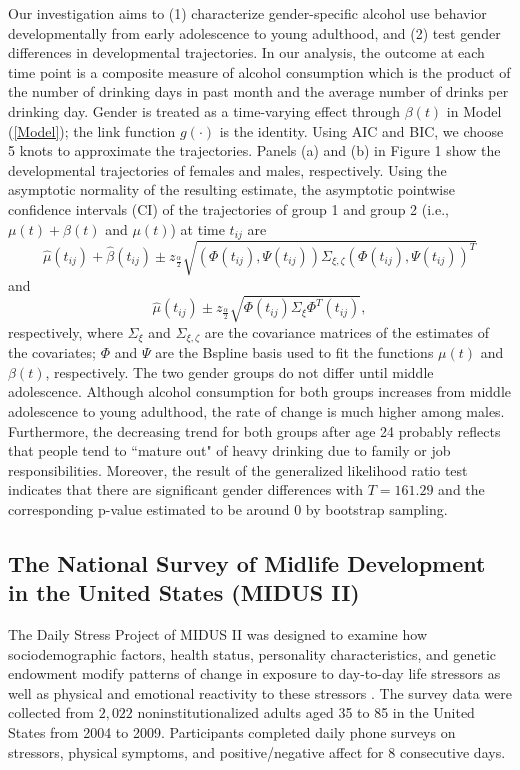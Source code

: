 Our investigation aims to (1) characterize gender-specific alcohol
use behavior developmentally from early adolescence to young
adulthood, and (2) test gender differences in developmental
trajectories. In our analysis, the outcome at each time point is a
composite measure of alcohol consumption which is the product of
the number of drinking days in past month and the average number
of drinks per drinking day. Gender is treated as a time-varying
effect through $\beta(t)$ in Model (\ref{Model}); the link
function $g(\cdot)$ is the identity. Using AIC and BIC, we choose
5 knots to approximate the trajectories. Panels (a) and (b) in
Figure 1 show the developmental trajectories of females and males,
respectively. Using the asymptotic normality of the resulting
estimate, the asymptotic pointwise confidence intervals (CI) of
the trajectories of group 1 and group 2 (i.e., $\mu(t)+\beta(t)$
and $\mu(t)$) at time $t_{ij}$ are
$$
\hat{\mu}(t_{ij}) + \hat{\beta}(t_{ij})\pm
z_{\frac{\alpha}{2}}\sqrt{(\Phi(t_{ij}),\Psi(t_{ij}))\Sigma_{\xi,\zeta}(\Phi(t_{ij}),\Psi(t_{ij}))^{T}}$$
and
$$
\hat{\mu}(t_{ij})\pm
z_{\frac{\alpha}{2}}\sqrt{\Phi(t_{ij})\Sigma_{\xi}\Phi^{T}(t_{ij})},
$$
respectively, where $\Sigma_{\xi}$ and $\Sigma_{\xi,\zeta}$ are
the covariance matrices of the estimates of the covariates; $\Phi$
and $\Psi$ are the Bspline basis used to fit the functions
$\mu(t)$ and $\beta(t)$, respectively. The two gender groups do
not differ until middle adolescence. Although alcohol consumption
for both groups increases from middle adolescence to young
adulthood, the rate of change is much higher among males.
Furthermore, the decreasing trend for both groups after age 24
probably reflects that people tend to ``mature out" of heavy
drinking due to family or job responsibilities. Moreover, the
result of the generalized likelihood ratio test indicates that
there are significant gender differences with $T=161.29$ and the
corresponding p-value estimated to be around $0$ by bootstrap
sampling.

\subsection{The National Survey of Midlife Development in the
United States (MIDUS II)}

The Daily Stress Project of MIDUS II was designed to examine how
sociodemographic factors, health status, personality
characteristics, and genetic endowment modify patterns of change
in exposure to day-to-day life stressors as well as physical and
emotional reactivity to these stressors \cite{ryff10}. The survey
data were collected from $2,022$ noninstitutionalized adults aged
35 to 85 in the United States from 2004 to 2009. Participants
completed daily phone surveys on stressors, physical symptoms, and
positive/negative affect for 8 consecutive days.

